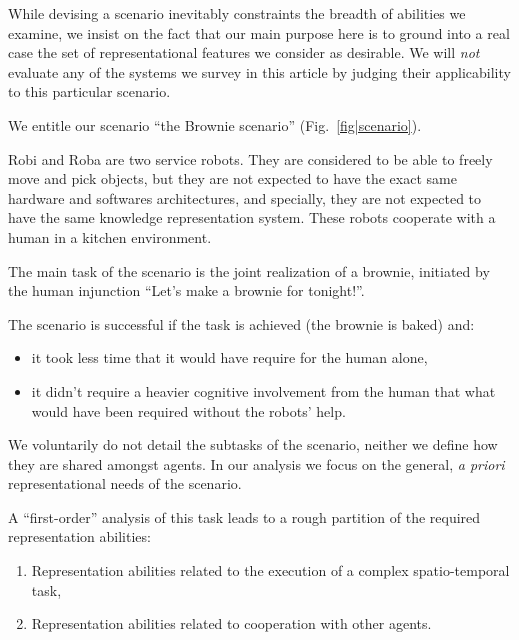 \documentclass[a4paper, twocolumn]{article}
\begin{document}
While devising a scenario inevitably constraints the breadth of abilities we
examine, we insist on the fact that our main purpose here is to ground into a
real case the set of representational features we consider as desirable.  We
will \emph{not} evaluate any of the systems we survey in this article by
judging their applicability to this particular scenario.

We entitle our scenario ``the Brownie scenario'' (Fig.~\ref{fig|scenario}).

Robi and Roba are two service robots. They are considered to be able to freely
move and pick objects, but they are not expected to have the exact same
hardware and softwares architectures, and specially, they are not expected to
have the same knowledge representation system. These robots cooperate with a
human in a kitchen environment.

The main task of the scenario is the joint realization of a brownie, initiated
by the human injunction ``Let's make a brownie for tonight!''.

The scenario is successful if the task is achieved (the brownie is baked) and:

\begin{itemize} 

	\item it took less time that it would have require for the human alone, 

	\item it didn't require a heavier cognitive involvement from the human that
	what would have been required without the robots' help.  

\end{itemize}

We voluntarily do not detail the subtasks of the scenario, neither we define
how they are shared amongst agents. In our analysis we focus on the general,
\textit{a priori} representational needs of the scenario.

A ``first-order'' analysis of this task leads to a rough partition of the
required representation abilities:

\begin{enumerate}

	\item Representation abilities related to the execution of a complex
	spatio-temporal task,

	\item Representation abilities related to cooperation with other agents.

\end{enumerate}
\end{document}

